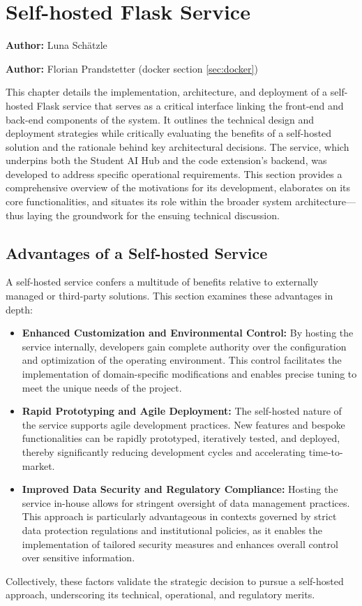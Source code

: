 \chapter{Self-hosted Flask Service}
\label{cha:hosted_flask_service}
\textbf{Author:} Luna Schätzle

\textbf{Author:} Florian Prandstetter (docker section \ref{sec:docker})

This chapter details the implementation, architecture, and deployment of a self-hosted Flask service that serves as a critical 
interface linking the front-end and back-end components of the system. It outlines the technical design and deployment strategies 
while critically evaluating the benefits of a self-hosted solution and the rationale behind key architectural decisions. The service, 
which underpins both the Student AI Hub and the code extension’s backend, was developed to address specific operational requirements. 
This section provides a comprehensive overview of the motivations for its development, elaborates on its core functionalities, 
and situates its role within the broader system architecture—thus laying the groundwork for the ensuing technical discussion.


\section{Advantages of a Self-hosted Service}
A self-hosted service confers a multitude of benefits relative to externally managed or third-party solutions. This section examines these advantages in depth:
\begin{itemize}
    \item \textbf{Enhanced Customization and Environmental Control:} By hosting the service internally, developers gain complete authority over the configuration and optimization of the operating environment. This control facilitates the implementation of domain-specific modifications and enables precise tuning to meet the unique needs of the project.
    \item \textbf{Rapid Prototyping and Agile Deployment:} The self-hosted nature of the service supports agile development practices. New features and bespoke functionalities can be rapidly prototyped, iteratively tested, and deployed, thereby significantly reducing development cycles and accelerating time-to-market.
    \item \textbf{Improved Data Security and Regulatory Compliance:} Hosting the service in-house allows for stringent oversight of data management practices. This approach is particularly advantageous in contexts governed by strict data protection regulations and institutional policies, as it enables the implementation of tailored security measures and enhances overall control over sensitive information.
\end{itemize}
Collectively, these factors validate the strategic decision to pursue a self-hosted approach, underscoring its technical, operational, and regulatory merits.

